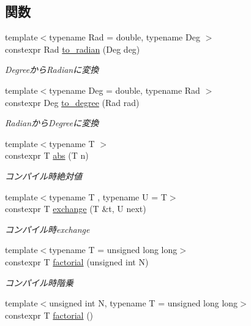\subsection*{関数}
\begin{DoxyCompactItemize}
\item 
{\footnotesize template$<$typename Rad  = double, typename Deg $>$ }\\constexpr Rad \mbox{\hyperlink{namespacesaki_aae246ec576e9e2da23c0c142e6fc4d6a}{to\+\_\+radian}} (Deg deg)
\begin{DoxyCompactList}\small\item\em Degreeから\+Radianに変換 \end{DoxyCompactList}\item 
{\footnotesize template$<$typename Deg  = double, typename Rad $>$ }\\constexpr Deg \mbox{\hyperlink{namespacesaki_aa28ebe642bd2c0e608e2a61c34b3d7a5}{to\+\_\+degree}} (Rad rad)
\begin{DoxyCompactList}\small\item\em Radianから\+Degreeに変換 \end{DoxyCompactList}\item 
{\footnotesize template$<$typename T $>$ }\\constexpr T \mbox{\hyperlink{namespacesaki_a012046e05c5909bb34ca3e609ca74ff3}{abs}} (T n)
\begin{DoxyCompactList}\small\item\em コンパイル時絶対値 \end{DoxyCompactList}\item 
{\footnotesize template$<$typename T , typename U  = T$>$ }\\constexpr T \mbox{\hyperlink{namespacesaki_ad2deeae63db0667c034ff616bf6e3886}{exchange}} (T \&t, U next)
\begin{DoxyCompactList}\small\item\em コンパイル時exchange \end{DoxyCompactList}\item 
{\footnotesize template$<$typename T  = unsigned long long$>$ }\\constexpr T \mbox{\hyperlink{namespacesaki_a59cd7e099937e5f8bcf5aa612745690c}{factorial}} (unsigned int N)
\begin{DoxyCompactList}\small\item\em コンパイル時階乗 \end{DoxyCompactList}\item 
{\footnotesize template$<$unsigned int N, typename T  = unsigned long long$>$ }\\constexpr T \mbox{\hyperlink{namespacesaki_a9dead910b791cee99cf82d1bd2a5d90c}{factorial}} ()

\end{DoxyCompactItemize}
